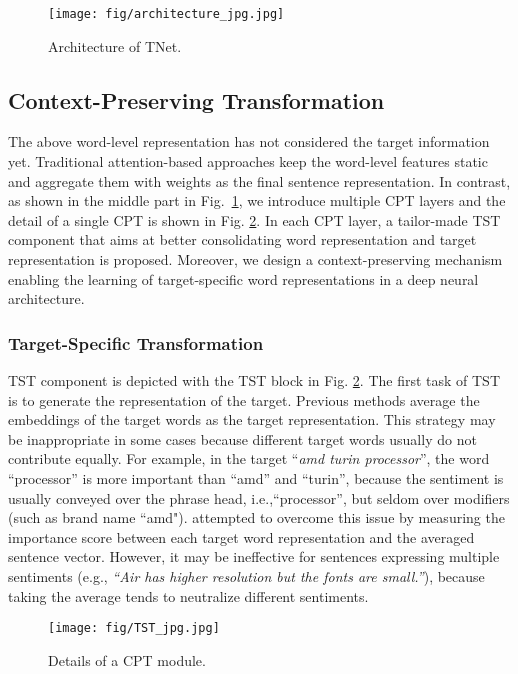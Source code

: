 \documentclass[11pt,a4paper]{article}
\begin{document}
\begin{figure}[!t]
    \centering
    \texttt{[image: fig/architecture\_jpg.jpg]}
\caption{Architecture of TNet.}
    \label{fig:architecture}
\end{figure}

\subsection{Context-Preserving Transformation}
\label{sec:cpt}
The above word-level representation has not considered the target information yet. Traditional attention-based approaches keep the word-level features static and aggregate them with weights as the final sentence representation. In contrast, as shown in the middle part in Fig.~\ref{fig:architecture}, we introduce multiple CPT layers and the detail of a single CPT is shown in Fig. \ref{fig:ast}. In each CPT layer, a tailor-made TST component that aims at better consolidating word representation and target representation is proposed. Moreover, we design a context-preserving mechanism enabling the learning of target-specific word representations in a deep neural architecture.

\subsubsection{Target-Specific Transformation}
TST component is depicted with the TST block in Fig. \ref{fig:ast}.
The first task of TST is to generate the representation of the target. Previous methods \cite{chen-EtAl:2017:EMNLP20171,liu-zhang:2017:EACLshort} average the embeddings of the target words as the target representation. This strategy may be inappropriate in some cases because different target words usually do not contribute equally. For example, in the target ``\textit{amd turin processor}'', the word ``processor'' is more important than ``amd'' and ``turin'', because the sentiment is usually conveyed over the phrase head, i.e.,``processor'', but seldom over modifiers (such as brand name ``amd").
\citet{ma2017interactive} attempted to overcome this issue by measuring the importance score between each target word representation and the averaged sentence vector. However, it may be ineffective for sentences expressing multiple sentiments (e.g., \textit{``Air has higher resolution but the fonts are small.''}), because taking the average tends to neutralize different sentiments. 

\begin{figure}[!t]
    \centering
    \texttt{[image: fig/TST\_jpg.jpg]}
\caption{Details of a CPT module.}
    \label{fig:ast}
\end{figure}
\end{document}
